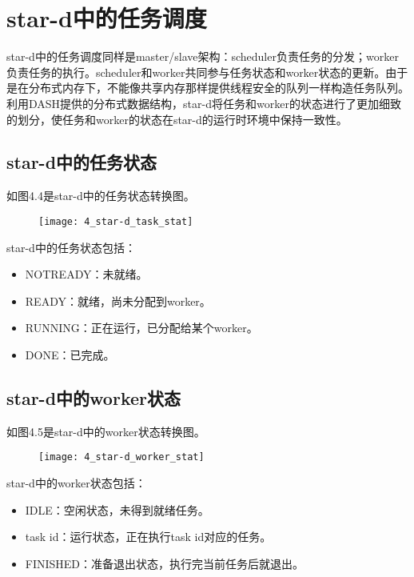 \section{star-d中的任务调度}

star-d中的任务调度同样是master/slave架构：scheduler负责任务的分发；worker负责任务的执行。scheduler和worker共同参与任务状态和worker状态的更新。由于是在分布式内存下，不能像共享内存那样提供线程安全的队列一样构造任务队列。利用DASH提供的分布式数据结构，star-d将任务和worker的状态进行了更加细致的划分，使任务和worker的状态在star-d的运行时环境中保持一致性。

\subsection{star-d中的任务状态}

如图4.4是star-d中的任务状态转换图。

\begin{figure}[!htbp]
    \centering
    \texttt{[image: 4\_star-d\_task\_stat]}
    \label{fig:4_star-d_task_stat}
\end{figure}

star-d中的任务状态包括：

\begin{itemize}
	\item NOTREADY：未就绪。
	\item READY：就绪，尚未分配到worker。
	\item RUNNING：正在运行，已分配给某个worker。
	\item DONE：已完成。
\end{itemize}

\subsection{star-d中的worker状态}

如图4.5是star-d中的worker状态转换图。

\begin{figure}[!htbp]
    \centering
    \texttt{[image: 4\_star-d\_worker\_stat]}
    \label{fig:4_star-d_worker_stat}
\end{figure}

star-d中的worker状态包括：

\begin{itemize}
	\item IDLE：空闲状态，未得到就绪任务。
	\item task id：运行状态，正在执行task id对应的任务。
	\item FINISHED：准备退出状态，执行完当前任务后就退出。
\end{itemize}

